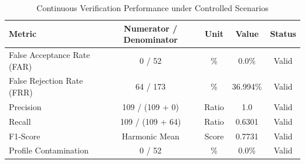 \begin{table}[htbp]
\centering
\caption{Continuous Verification Performance under Controlled Scenarios}
\label{tab:verification_metrics}
\begin{tabular}{lcccc}
\toprule
\textbf{Metric} & \textbf{Numerator / Denominator} & \textbf{Unit} & \textbf{Value} & \textbf{Status} \\
\midrule
False Acceptance Rate (FAR) & 0 / 52 & \% & 0.0\% & Valid \\
False Rejection Rate (FRR) & 64 / 173 & \% & 36.994\% & Valid \\
Precision & 109 / (109 + 0) & Ratio & 1.0 & Valid \\
Recall & 109 / (109 + 64) & Ratio & 0.6301 & Valid \\
F1-Score & Harmonic Mean & Score & 0.7731 & Valid \\
Profile Contamination & 0 / 52 & \% & 0.0\% & Valid \\
\bottomrule
\end{tabular}
\end{table}
